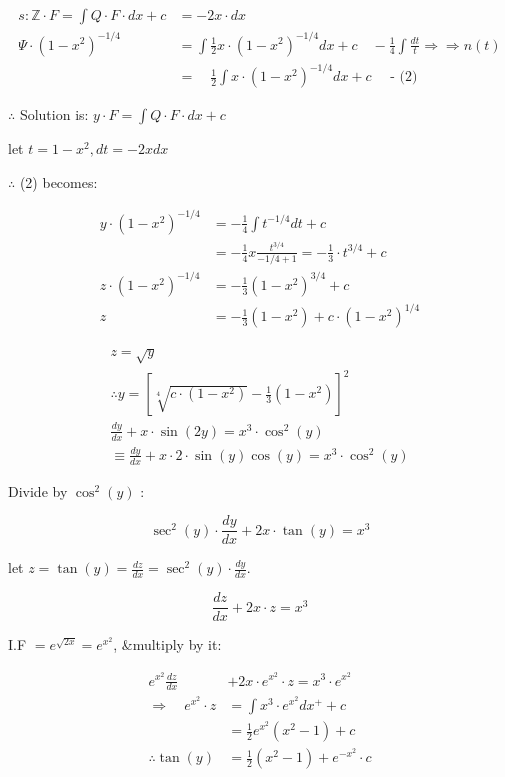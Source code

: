 \documentclass[12pt, a4paper]{article}
\begin{document}
\begin{align*}
s: \mathbb{Z} \cdot F=\int Q \cdot F \cdot d x+c & =-2 x \cdot d x \\
\Psi \cdot\left(1-x^{2}\right)^{-1 / 4} & =\int \frac{1}{2} x \cdot\left(1-x^{2}\right)^{-1 / 4} d x+c \quad-\frac{1}{4} \int \frac{d t}{t} \Rightarrow \Rightarrow n(t) \\
& =\quad \frac{1}{2} \int x \cdot\left(1-x^{2}\right)^{-1 / 4} d x+c \quad \text { - (2) }
\end{align*}


$\therefore$ Solution is: $y \cdot F=\int Q \cdot F \cdot d x+c$

let $t=1-x^{2}, d t=-2 x d x$

$\therefore$ (2) becomes:

$$
\begin{aligned}
y \cdot\left(1-x^{2}\right)^{-1 / 4} & =-\frac{1}{4} \int t^{-1 / 4} d t+c \\
& =-\frac{1}{4} x \frac{t^{3 / 4}}{-1 / 4+1}=-\frac{1}{3} \cdot t^{3 / 4}+c \\
z \cdot\left(1-x^{2}\right)^{-1 / 4} & =-\frac{1}{3}\left(1-x^{2}\right)^{3 / 4}+c \\
z & =-\frac{1}{3}\left(1-x^{2}\right)+c \cdot\left(1-x^{2}\right)^{1 / 4}
\end{aligned}
$$

$$
\begin{gathered}
z=\sqrt{y} \\
\therefore y=\left[\sqrt[4]{c \cdot\left(1-x^{2}\right)}-\frac{1}{3}\left(1-x^{2}\right)\right]^{2} \\
\frac{d y}{d x}+x \cdot \sin (2 y)=x^{3} \cdot \cos ^{2}(y) \\
\equiv \frac{d y}{d x}+x \cdot 2 \cdot \sin (y) \cos (y)=x^{3} \cdot \cos ^{2}(y)
\end{gathered}
$$

Divide by $\cos ^{2}(y)$ :

$$
\sec ^{2}(y) \cdot \frac{d y}{d x}+2 x \cdot \tan (y)=x^{3}
$$

let $z=\tan (y)=\frac{d z}{d x}=\sec ^{2}(y) \cdot \frac{d y}{d x}$.

$$
\frac{d z}{d x}+2 x \cdot z=x^{3}
$$

I.F $=e^{\sqrt{2 x}}=e^{x^{2}}$, \&multiply by it:

$$
\begin{aligned}
e^{x^{2}} \frac{d z}{d x} & +2 x \cdot e^{x^{2}} \cdot z=x^{3} \cdot e^{x^{2}} \\
\Rightarrow \quad e^{x^{2}} \cdot z & =\int x^{3} \cdot e^{x^{2}} d x^{+}+c \\
& =\frac{1}{2} e^{x^{2}}\left(x^{2}-1\right)+c \\
\therefore \tan (y) & =\frac{1}{2}\left(x^{2}-1\right)+e^{-x^{2}} \cdot c
\end{aligned}
$$
\end{document}
